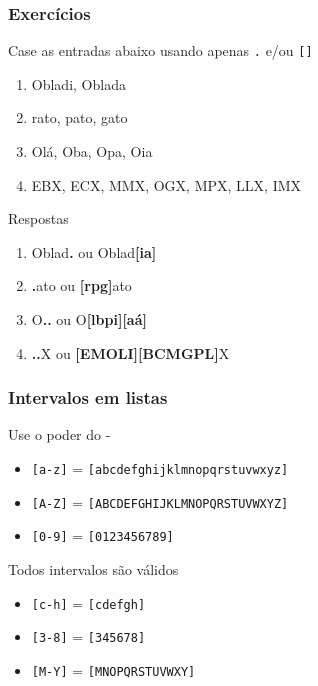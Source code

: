 \documentclass{beamer}
\begin{document}
\begin{frame}
 \frametitle{Exercícios}
 \begin{block}{Case as entradas abaixo usando apenas \texttt{.} e/ou \texttt{[]}}
  \begin{enumerate}
   \item Obladi, Oblada
   \item rato, pato, gato
   \item Olá, Oba, Opa, Oia
   \item EBX, ECX, MMX, OGX, MPX, LLX, IMX
  \end{enumerate}
 \end{block}

 \pause
 \begin{block}{Respostas}
  \begin{enumerate}
   \item Oblad\textbf{.} ou Oblad\textbf{[ia]}
	\pause
   \item \textbf{.}ato ou \textbf{[rpg]}ato
	\pause
   \item O\textbf{..} ou O\textbf{[lbpi][aá]}
	\pause
   \item \textbf{..}X ou \textbf{[EMOLI][BCMGPL]}X
  \end{enumerate}
 \end{block}
\end{frame}

\begin{frame}
 \frametitle{Intervalos em listas}
 \begin{block}{Use o poder do -}
  \begin{itemize}
   \item \texttt{[a-z]} = \texttt{[abcdefghijklmnopqrstuvwxyz]}
   \item \texttt{[A-Z]} = \texttt{[ABCDEFGHIJKLMNOPQRSTUVWXYZ]}
   \item \texttt{[0-9]} = \texttt{[0123456789]}
  \end{itemize}
 \end{block}

 \pause
 \begin{block}{Todos intervalos são válidos}
  \begin{itemize}
   \item \texttt{[c-h]} = \texttt{[cdefgh]}
   \item \texttt{[3-8]} = \texttt{[345678]}
   \item \texttt{[M-Y]} = \texttt{[MNOPQRSTUVWXY]}
  \end{itemize}
 \end{block}
\end{frame}
\end{document}
